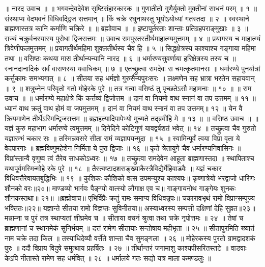 ॥ नारद उवाच ॥ ॥
भगवन्देवदेवेश सृष्टिसंहारकारक ॥
गुणातीतो गुणैर्युक्तो मुक्तीनां साधनं परम् ॥ १ ॥
संस्थाप्य वेदभवनं विधिवद्द्विज सत्तमान् ॥
किं चक्रे रघुनाथस्तु भूयोऽयोध्यां गतस्तदा ॥ २ ॥
स्वस्थाने ब्राह्मणास्तत्र कानि कर्माणि चक्रिरे ॥
॥ ब्रह्मोवाच ॥ ॥
इष्टापूर्तरताः शान्ताः प्रतिग्रहपराङ्मुखाः ॥ ३ ॥
राज्यं चक्रुर्वनस्यास्य पुरोधा द्विजसत्तमः ॥
उवाच रामपुरतस्तीर्थमाहात्म्यमुत्तमम् ॥ ४ ॥
प्रयागस्य च माहात्म्यं त्रिवेणीफलमुत्तमम् ॥
प्रयागतीर्थमहिमा शुक्लतीर्थस्य चैव हि ॥ ५ ॥
सिद्धक्षेत्रस्य काश्याश्च गङ्गाया महिमा तथा ॥
वसिष्ठः कथया मास तीर्थान्यन्यानि नारद ॥ ६ ॥
धर्मारण्यसुवर्णाया हरिक्षेत्रस्य तस्य च ॥
स्नानदानादिकं सर्वं वाराणस्या यवाधिकम् ॥ ७ ॥
एतच्छ्रुत्वा रामदेवः स चमत्कृतमानसः ॥
धर्मारण्ये पुनर्यात्रां कर्त्तुकामः समभ्यगात् ॥ ८ ॥
सीतया सह धर्मज्ञो गुरुसैन्यपुरःसरः ॥
लक्ष्मणेन सह भ्रात्रा भरतेन सहायवान् ॥ ९ ॥
शत्रुघ्नेन परिवृतो गतो मोहेरके पुरे ॥
तत्र गत्वा वसिष्ठं तु पृच्छतेऽसौ महामनाः ॥ १० ॥
॥ राम उवाच ॥ ॥
धर्मारण्ये महाक्षेत्रे किं कर्त्तव्यं द्विजोत्तम ॥
दानं वा नियमो वाथ स्नानं वा तप उत्तमम् ॥ ११ ॥
 ध्यानं वाथ क्रतुं वाथ होमं वा जपमुत्तमम् ॥
दानं वा नियमं वाथ स्नानं वा तप उत्तमम्॥ १२ ॥
येन वै क्रियमाणेन तीर्थेऽस्मिन्द्विजसत्तम ॥
ब्रह्महत्यादिपापेभ्यो मुच्यते तद्ब्रवीहि मे ॥ १३ ॥
॥ वसिष्ठ उवाच ॥ ॥
यज्ञं कुरु महाभाग धर्मारण्ये त्वमुत्तमम् ॥
दिनेदिने कोटिगुणं यावद्वर्षशतं भवेत् ॥ १४ ॥
तच्छ्रुत्वा चैव गुरुतो यज्ञारम्भं चकार सः ॥
तस्मिन्नवसरे सीता रामं व्यज्ञापयन्मुदा ॥ १५ ॥
स्वामिन्पूर्वं त्वया विप्रा वृता ये वेदपारगाः ॥
ब्रह्मविष्णुमहेशेन निर्मिता ये पुरा द्विजाः ॥ १६ ॥
कृते त्रेतायुगे चैव धर्मारण्यनिवासिनः ॥
विप्रांस्तान्वै वृणुष्व त्वं तैरेव साधकोऽध्वरः ॥ १७ ॥
तच्छ्रुत्वा रामदेवेन आहूता ब्राह्मणास्तदा ॥
स्थापिताश्च यथापूर्वमस्मिन्मोहे रके पुरे ॥ १८ ॥
तैस्त्वष्टादशसङ्ख्याकैस्त्रैविद्यैर्मेहिवाडवैः ॥
यज्ञं चकार विधिवत्तैरेवायतबुद्धिभिः ॥ १९ ॥
कुशिकः कौशिको वत्स उपमन्युश्च काश्यपः॥
कृष्णात्रेयो भरद्वाजो धारिणः शौनको वरः॥२०॥
माण्डव्यो भार्गवः पैङ्ग्यो वात्स्यो लौगाक्ष एव च॥
गाङ्गायनोथ गाङ्गेयः शुनकः शौनकस्तथा॥ २१॥
॥ब्रह्मोवाच॥
एभिर्विप्रैः क्रतुं रामः समाप्य विधिवन्नृपः॥
चकारावभृथं रामो विप्रान्सम्पूज्य भक्तितः॥२२॥
यज्ञान्ते सीतया रामो विज्ञप्तः सुविनीतया॥
अस्याध्वरस्य सम्पत्ती दक्षिणां देहि सुव्रत॥२३॥
मन्नाम्ना च पुरं तत्र स्थाप्यतां शीघ्रमेव च ॥
सीताया वचनं श्रुत्वा तथा चक्रे नृपोत्तमः ॥ २४ ॥
तेषां च ब्राह्मणानां च स्थानमेकं सुनिर्भयम् ॥
दत्तं रामेण सीतायाः सन्तोषाय महीभृता ॥ २५ ॥
सीतापुरमिति ख्यातं नाम चक्रे तदा किल ॥
तस्याधिदेव्यौ वर्त्तेते शान्ता चैव सुमङ्गला ॥ २६ ॥
मोहेरकस्य पुरतो ग्रामद्वादशकं पुरः ॥
ददौ विप्राय विदुषे समुत्थाय प्रहर्षितः ॥ २७ ॥
तीर्थान्तरं जगामाशु काश्यपीसरितस्तटे ॥
वाडवाः केऽपि नीतास्ते रामेण सह धर्मवित् ॥ २८ ॥
धर्मालये गतः सद्यो यत्र माला कमण्डलुः ॥
